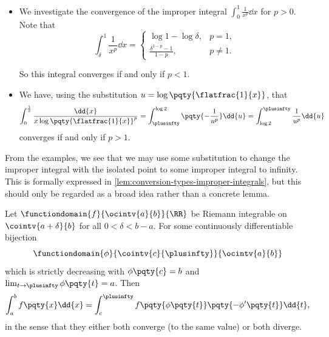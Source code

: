 \begin{examples}
    \label{ex:improper-integral-isolated-singularity}%
    \begin{itemize}
        \item We investigate the convergence of the improper integral \(\int_{0}^{1} \frac{1}{x^p} \dd{x}\) for \(p > 0\). Note that
        \[
            \int_{\delta}^{1} \frac{1}{x^p} \dd{x} = \begin{cases}
                \log 1 - \log \delta, & p = 1, \\
                \frac{\delta^{1 - p} - 1}{1 - p}, & p \neq 1.
            \end{cases}
        \]

        So this integral converges if and only if \(p < 1\).

        \item We have, using the substitution \(u = \log\pqty{\flatfrac{1}{x}}\), that
        \[
            \int_{0}^{\frac{1}{2}} \frac{\dd{x}}{x \log\pqty{\flatfrac{1}{x}}^p} = \int_{\plusinfty}^{\log 2} \pqty{- \frac{1}{u^p}} \dd{u} = \int_{\log 2}^{\plusinfty} \frac{1}{u^p} \dd{u}
        \]
        converges if and only if \(p > 1\).
    \end{itemize}
\end{examples}

From the examples, we see that we may use some substitution to change the improper integral with the isolated point to some improper integral to infinity. This is formally expressed in \autoref{lem:conversion-types-improper-integrals}, but this should only be regarded as a broad idea rather than a concrete lemma.

\begin{lemma}
    \label{lem:conversion-types-improper-integrals}%
    Let \(\functiondomain{f}{\ocintv{a}{b}}{\RR}\) be Riemann integrable on \(\cointv{a + \delta}{b}\) for all \(0 < \delta < b - a\). For some continuously differentiable bijection
    \[
        \functiondomain{\phi}{\cointv{c}{\plusinfty}}{\ocintv{a}{b}}
    \]
    which is strictly decreasing with \(\phi\pqty{c} = b\) and \(\lim_{t \to \plusinfty} \phi\pqty{t} = a\). Then
    \[
        \int_{a}^{b} f\pqty{x} \dd{x} = \int_{c}^{\plusinfty} f\pqty{\phi\pqty{t}} \pqty{- \phi'\pqty{t}} \dd{t},
    \]
    in the sense that they either both converge (to the same value) or both diverge.
\end{lemma}